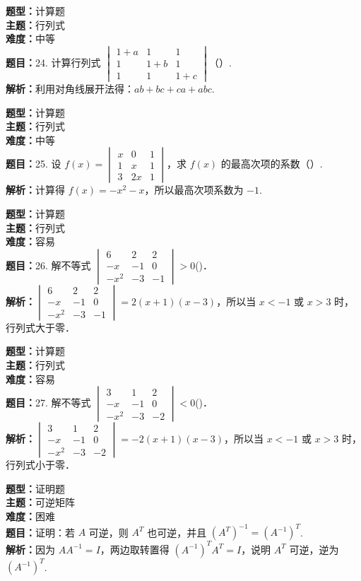 \documentclass{ctexart}
\newenvironment{question}[5]{%
	\noindent\textbf{题型：}#1\\
	\textbf{主题：}#2\\
	\textbf{难度：}#3\\
	\textbf{题目：}#4\\
	\textbf{解析：}#5\\
	\vspace{1em}
}{}
\begin{document}
	\begin{question} 
		{计算题} 
		{行列式}
		{中等}
		{24. 计算行列式 \(\begin{vmatrix} 1+a & 1 & 1 \\ 1 & 1+b & 1 \\ 1 & 1 & 1+c\end{vmatrix}\)（）. }
		{利用对角线展开法得：\(ab + bc + ca + abc\). }
	\end{question}
	
	\begin{question} 
		{计算题} 
		{行列式}
		{中等}
		{25. 设 \(f(x)=\begin{vmatrix} x & 0 & 1 \\ 1 & x & 1 \\ 3 & 2x & 1\end{vmatrix}\)，求 \(f(x)\) 的最高次项的系数（）. }
		{计算得 \(f(x) = -x^2 - x\)，所以最高次项系数为 \(-1\). }
	\end{question}
	
	\begin{question} 
		{计算题} 
		{行列式}
		{容易}
		{26. 解不等式 \(\begin{vmatrix} 6 & 2 & 2 \\ -x & -1 & 0 \\ -x^2 & -3 & -1\end{vmatrix}>0\)(\qquad)．}
		{\(\begin{vmatrix} 6 & 2 & 2 \\ -x & -1 & 0 \\ -x^2 & -3 & -1\end{vmatrix} = 2(x+1)(x-3)\)，所以当 \(x<-1\) 或 \(x>3\) 时，行列式大于零．}
	\end{question}
	
	\begin{question} 
		{计算题} 
		{行列式}
		{容易}
		{27. 解不等式 \(\begin{vmatrix} 3 & 1 & 2 \\ -x & -1 & 0 \\ -x^2 & -3 & -2\end{vmatrix}<0\)(\qquad)．}
		{\(\begin{vmatrix} 3 & 1 & 2 \\ -x & -1 & 0 \\ -x^2 & -3 & -2\end{vmatrix} = -2(x+1)(x-3)\)，所以当 \(x<-1\) 或 \(x>3\) 时，行列式小于零．}
	\end{question}
	

	
	\begin{question}
		{证明题}
		{可逆矩阵}
		{困难}
		{证明：若 \( A \) 可逆，则 \( A^T \) 也可逆，并且 \( (A^T)^{-1} = (A^{-1})^T \). }
		{因为 \( A A^{-1} = I \)，两边取转置得 \( (A^{-1})^T A^T = I \)，说明 \( A^T \) 可逆，逆为 \( (A^{-1})^T \). }
	\end{question}
\end{document}

